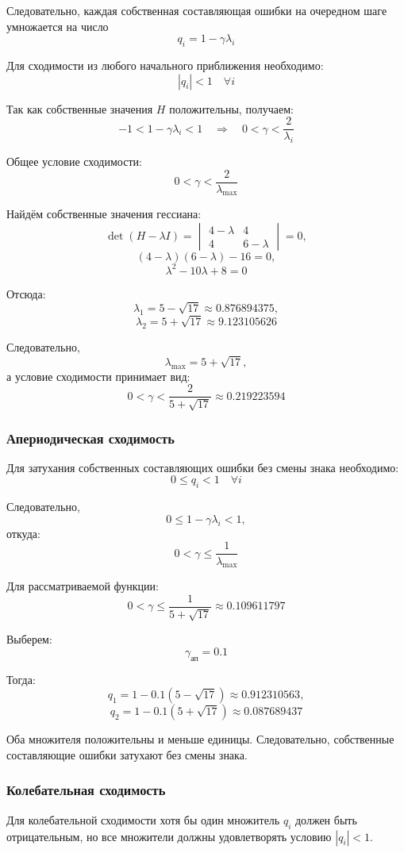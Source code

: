 Следовательно, каждая собственная составляющая ошибки
на очередном шаге умножается на число
\[
q_i=1-\gamma\lambda_i
\]

Для сходимости из любого начального приближения необходимо:
\[
|q_i|<1
\quad\forall i
\]

Так как собственные значения \(H\) положительны,
получаем:
\[
-1<1-\gamma\lambda_i<1
\quad\Rightarrow\quad
0<\gamma<\frac{2}{\lambda_i}
\]

Общее условие сходимости:
\[
\boxed{
0<\gamma<\frac{2}{\lambda_{\max}}
}
\]

Найдём собственные значения гессиана:
\[
\det(H-\lambda I)
=
\begin{vmatrix}
4-\lambda&4\\
4&6-\lambda
\end{vmatrix}
=0,
\]
\[
(4-\lambda)(6-\lambda)-16=0,
\]
\[
\lambda^2-10\lambda+8=0
\]

Отсюда:
\[
\lambda_1=5-\sqrt{17}\approx0.876894375,
\]
\[
\lambda_2=5+\sqrt{17}\approx9.123105626
\]

Следовательно,
\[
\lambda_{\max}=5+\sqrt{17},
\]
а условие сходимости принимает вид:
\[
0<\gamma<
\frac{2}{5+\sqrt{17}}
\approx0.219223594
\]

\subsubsection*{Апериодическая сходимость}

Для затухания собственных составляющих ошибки
без смены знака необходимо:
\[
0\leq q_i<1
\quad\forall i
\]

Следовательно,
\[
0\leq1-\gamma\lambda_i<1,
\]
откуда:
\[
0<\gamma\leq\frac{1}{\lambda_{\max}}
\]

Для рассматриваемой функции:
\[
0<\gamma\leq
\frac{1}{5+\sqrt{17}}
\approx0.109611797
\]

Выберем:
\[
\boxed{\gamma_{\mathrm{ап}}=0.1}
\]

Тогда:
\[
q_1=1-0.1(5-\sqrt{17})
\approx0.912310563,
\]
\[
q_2=1-0.1(5+\sqrt{17})
\approx0.087689437
\]

Оба множителя положительны и меньше единицы.
Следовательно, собственные составляющие ошибки
затухают без смены знака.

\subsubsection*{Колебательная сходимость}

Для колебательной сходимости хотя бы один множитель
\(q_i\) должен быть отрицательным,
но все множители должны удовлетворять условию
\(|q_i|<1\).

